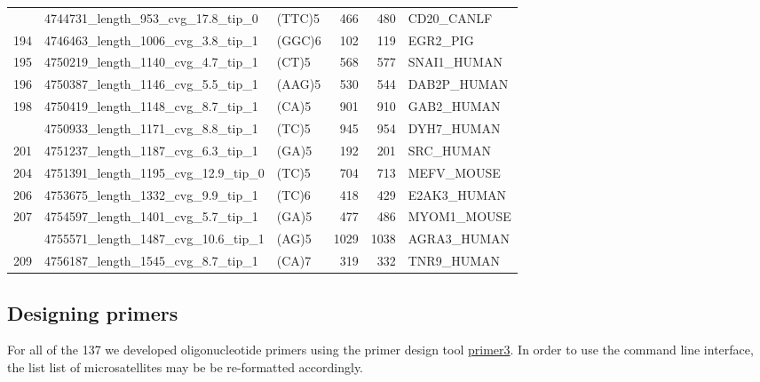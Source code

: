 \documentclass[]{article}
\begin{document}
\begin{longtable}[t]{lllrrl}
\addlinespace
192 & 4744731\_length\_953\_cvg\_17.8\_tip\_0 & (TTC)5 & 466 & 480 & CD20\_CANLF\\
194 & 4746463\_length\_1006\_cvg\_3.8\_tip\_1 & (GGC)6 & 102 & 119 & EGR2\_PIG\\
195 & 4750219\_length\_1140\_cvg\_4.7\_tip\_1 & (CT)5 & 568 & 577 & SNAI1\_HUMAN\\
196 & 4750387\_length\_1146\_cvg\_5.5\_tip\_1 & (AAG)5 & 530 & 544 & DAB2P\_HUMAN\\
198 & 4750419\_length\_1148\_cvg\_8.7\_tip\_1 & (CA)5 & 901 & 910 & GAB2\_HUMAN\\
\addlinespace
200 & 4750933\_length\_1171\_cvg\_8.8\_tip\_1 & (TC)5 & 945 & 954 & DYH7\_HUMAN\\
201 & 4751237\_length\_1187\_cvg\_6.3\_tip\_1 & (GA)5 & 192 & 201 & SRC\_HUMAN\\
204 & 4751391\_length\_1195\_cvg\_12.9\_tip\_0 & (TC)5 & 704 & 713 & MEFV\_MOUSE\\
206 & 4753675\_length\_1332\_cvg\_9.9\_tip\_1 & (TC)6 & 418 & 429 & E2AK3\_HUMAN\\
207 & 4754597\_length\_1401\_cvg\_5.7\_tip\_1 & (GA)5 & 477 & 486 & MYOM1\_MOUSE\\
\addlinespace
208 & 4755571\_length\_1487\_cvg\_10.6\_tip\_1 & (AG)5 & 1029 & 1038 & AGRA3\_HUMAN\\
209 & 4756187\_length\_1545\_cvg\_8.7\_tip\_1 & (CA)7 & 319 & 332 & TNR9\_HUMAN\\*
\end{longtable}

\newpage

\subsection{Designing primers}\label{designing-primers}

For all of the 137 we developed oligonucleotide primers using the primer
design tool \href{http://primer3.sourceforge.net/releases.php}{primer3}.
In order to use the command line interface, the list list of
microsatellites may be be re-formatted accordingly.
\end{document}

